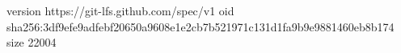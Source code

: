 version https://git-lfs.github.com/spec/v1
oid sha256:3df9efe9adfebf20650a9608e1e2cb7b521971c131d1fa9b9e9881460eb8b174
size 22004
